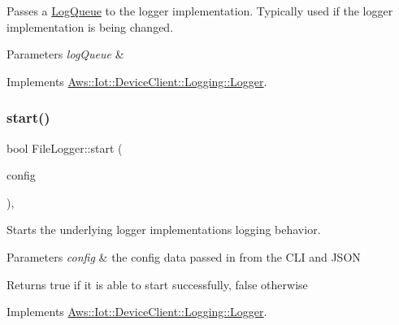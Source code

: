 Passes a \hyperlink{class_aws_1_1_iot_1_1_device_client_1_1_logging_1_1_log_queue}{Log\+Queue} to the logger implementation. Typically used if the logger implementation is being changed. 


\begin{DoxyParams}{Parameters}
{\em log\+Queue} & \\
\hline
\end{DoxyParams}


Implements \hyperlink{class_aws_1_1_iot_1_1_device_client_1_1_logging_1_1_logger_a6b80ca4200fbc58bb2994ef4319ea822}{Aws\+::\+Iot\+::\+Device\+Client\+::\+Logging\+::\+Logger}.

\mbox{\label{class_aws_1_1_iot_1_1_device_client_1_1_logging_1_1_file_logger_ac9373269d6d5c7a5ee1ba896182c97ff}} 
\subsubsection{\texorpdfstring{start()}{start()}}
{\footnotesize\ttfamily bool File\+Logger\+::start (\begin{DoxyParamCaption}\item[{const \hyperlink{struct_aws_1_1_iot_1_1_device_client_1_1_plain_config}{Plain\+Config} \&}]{config }\end{DoxyParamCaption})\hspace{0.3cm}{\ttfamily [override]}, {\ttfamily [virtual]}}



Starts the underlying logger implementation\textquotesingle{}s logging behavior. 


\begin{DoxyParams}{Parameters}
{\em config} & the config data passed in from the C\+LI and J\+S\+ON \\
\hline
\end{DoxyParams}
\begin{DoxyReturn}{Returns}
true if it is able to start successfully, false otherwise 
\end{DoxyReturn}


Implements \hyperlink{class_aws_1_1_iot_1_1_device_client_1_1_logging_1_1_logger_ad42e38afcd7402f5dc1213b2f0b96961}{Aws\+::\+Iot\+::\+Device\+Client\+::\+Logging\+::\+Logger}.

